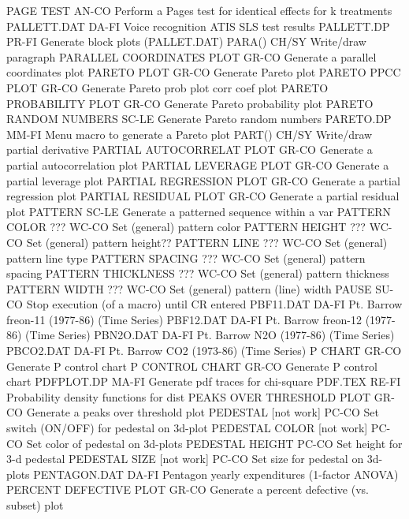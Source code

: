 PAGE TEST                   AN-CO Perform a Pages test for identical effects for k treatments
PALLETT.DAT                 DA-FI Voice recognition ATIS SLS test results
PALLETT.DP                  PR-FI Generate block plots (PALLET.DAT)
PARA()                      CH/SY Write/draw paragraph
PARALLEL COORDINATES PLOT   GR-CO Generate a parallel coordinates plot
PARETO PLOT                 GR-CO Generate Pareto plot
PARETO PPCC PLOT            GR-CO Generate Pareto prob plot corr coef plot
PARETO PROBABILITY PLOT     GR-CO Generate Pareto probability plot
PARETO RANDOM NUMBERS       SC-LE Generate Pareto random numbers
PARETO.DP                   MM-FI Menu macro to generate a Pareto plot
PART()                      CH/SY Write/draw partial derivative
PARTIAL AUTOCORRELAT PLOT   GR-CO Generate a partial autocorrelation plot
PARTIAL LEVERAGE PLOT       GR-CO Generate a partial leverage plot
PARTIAL REGRESSION PLOT     GR-CO Generate a partial regression plot
PARTIAL RESIDUAL PLOT       GR-CO Generate a partial residual plot
PATTERN                     SC-LE Generate a patterned sequence within a var
PATTERN COLOR        ???    WC-CO Set (general) pattern color
PATTERN HEIGHT       ???    WC-CO Set (general) pattern height??
PATTERN LINE         ???    WC-CO Set (general) pattern line type
PATTERN SPACING      ???    WC-CO Set (general) pattern spacing
PATTERN THICKLNESS   ???    WC-CO Set (general) pattern thickness
PATTERN WIDTH        ???    WC-CO Set (general) pattern (line) width
PAUSE                       SU-CO Stop execution (of a macro) until CR entered
PBF11.DAT                   DA-FI Pt. Barrow freon-11 (1977-86) (Time Series)
PBF12.DAT                   DA-FI Pt. Barrow freon-12 (1977-86) (Time Series)
PBN2O.DAT                   DA-FI Pt. Barrow N2O (1977-86) (Time Series)
PBCO2.DAT                   DA-FI Pt. Barrow CO2 (1973-86) (Time Series)
P CHART                     GR-CO Generate P control chart
P CONTROL CHART             GR-CO Generate P control chart
PDFPLOT.DP                  MA-FI Generate pdf traces for chi-square 
PDF.TEX                     RE-FI Probability density functions for dist
PEAKS OVER THRESHOLD PLOT   GR-CO Generate a peaks over threshold plot
PEDESTAL        [not work]  PC-CO Set switch (ON/OFF) for pedestal on 3d-plot
PEDESTAL COLOR  [not work]  PC-CO Set color of pedestal on 3d-plots
PEDESTAL HEIGHT             PC-CO Set height for 3-d pedestal
PEDESTAL SIZE   [not work]  PC-CO Set size for pedestal on 3d-plots
PENTAGON.DAT                DA-FI Pentagon yearly expenditures (1-factor ANOVA)
PERCENT DEFECTIVE PLOT      GR-CO Generate a percent defective (vs. subset) plot

